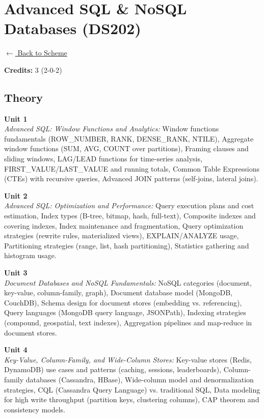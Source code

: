\section*{Advanced SQL \& NoSQL Databases (DS202)}
\label{major:DS_2}

\noindent \small{\hyperref[main:scheme]{$\leftarrow$ Back to Scheme}} \vspace{0.5cm}

\noindent \textbf{Credits:} 3 (2-0-2)

\subsection*{Theory}
\noindent\textbf{Unit 1} \\
\textit{Advanced SQL: Window Functions and Analytics:} Window functions fundamentals (ROW\_NUMBER, RANK, DENSE\_RANK, NTILE), Aggregate window functions (SUM, AVG, COUNT over partitions), Framing clauses and sliding windows, LAG/LEAD functions for time-series analysis, FIRST\_VALUE/LAST\_VALUE and running totals, Common Table Expressions (CTEs) with recursive queries, Advanced JOIN patterns (self-joins, lateral joins).

\vspace{0.3cm}

\noindent\textbf{Unit 2} \\
\textit{Advanced SQL: Optimization and Performance:} Query execution plans and cost estimation, Index types (B-tree, bitmap, hash, full-text), Composite indexes and covering indexes, Index maintenance and fragmentation, Query optimization strategies (rewrite rules, materialized views), EXPLAIN/ANALYZE usage, Partitioning strategies (range, list, hash partitioning), Statistics gathering and histogram usage.

\vspace{0.3cm}

\noindent\textbf{Unit 3} \\
\textit{Document Databases and NoSQL Fundamentals:} NoSQL categories (document, key-value, column-family, graph), Document database model (MongoDB, CouchDB), Schema design for document stores (embedding vs. referencing), Query languages (MongoDB query language, JSONPath), Indexing strategies (compound, geospatial, text indexes), Aggregation pipelines and map-reduce in document stores.

\vspace{0.3cm}

\noindent\textbf{Unit 4} \\
\textit{Key-Value, Column-Family, and Wide-Column Stores:} Key-value stores (Redis, DynamoDB) use cases and patterns (caching, sessions, leaderboards), Column-family databases (Cassandra, HBase), Wide-column model and denormalization strategies, CQL (Cassandra Query Language) vs. traditional SQL, Data modeling for high write throughput (partition keys, clustering columns), CAP theorem and consistency models.

